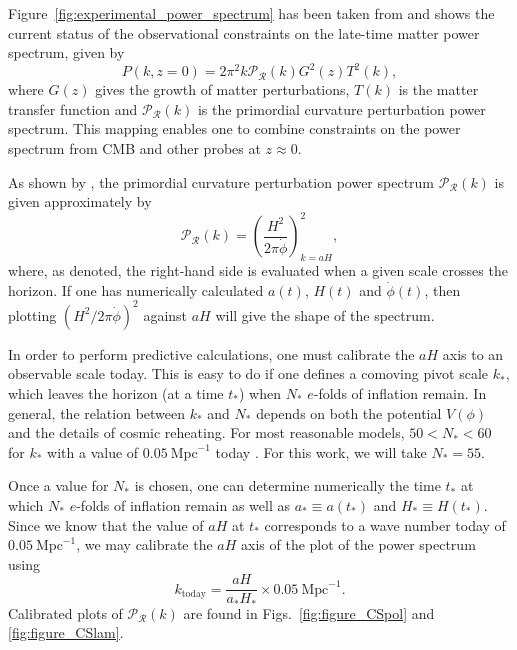 Figure~\ref{fig:experimental_power_spectrum} has been taken from \citet{hlozek_atacama_2012} and shows the current status of the observational constraints on the late-time matter power spectrum, given by
%
\begin{equation}
  P(k,z=0) = 2\pi^2 k \mathcal{P}_\mathcal{R}(k) G^2(z) T^2(k),
\end{equation}
%
where $G(z)$ gives the growth of matter perturbations, $T(k)$ is the matter transfer function and $\mathcal{P}_\mathcal{R}(k)$ is the primordial curvature perturbation power spectrum. This mapping enables one to combine constraints on the power spectrum from CMB and other probes at $z\approx 0$.




As shown by \citet{liddle_cosmological_2000}, the primordial curvature perturbation power spectrum $\mathcal{P}_{\mathcal{R}}(k)$ is given approximately by
%
\begin{equation}
  \mathcal{P}_{\mathcal{R}}(k)
  =
  \left(\frac{H^2}{2\pi\dot{\phi}}\right)^2_{k=a H},
  \label{eqn:curvature_power_spectrum}
\end{equation}
%
where, as denoted, the right-hand side is evaluated when a given scale crosses the horizon. If one has numerically calculated $a(t)$, $H(t)$ and $\dot{\phi}(t)$, then plotting $\left(H^2/ 2\pi\dot{\phi}\right)^2$ against $aH$ will give the shape of the spectrum.

In order to perform predictive calculations, one must calibrate the $aH$ axis to an observable scale today. This is easy to do if one defines a comoving pivot scale $k_*$, which leaves the horizon (at a time $t_*$) when $N_*$ $e$-folds of inflation remain. In general, the relation between $k_*$ and $N_*$ depends on both the potential $V(\phi)$ and the details of cosmic reheating. For most reasonable models, $50<N_*<60$  for $k_*$ with a value of $0.05\:\mathrm{Mpc}^{-1}$ today \citep{planck_collaboration_planck_2013-1}. For this work, we will take $N_*=55$. 

Once a value for $N_*$ is chosen, one can determine numerically the time $t_*$ at which $N_*$ $e$-folds of inflation remain as well as $a_*\equiv a(t_*)$ and $H_*\equiv H(t_*)$. Since we know that the value of $aH$ at $t_*$ corresponds to a wave number today of $0.05\:\mathrm{Mpc}^{-1}$, we may calibrate the $aH$ axis of the plot of the power spectrum using
%
\begin{equation}
  k_\mathrm{today} 
  = 
  \frac{aH}{a_*H_*}\times0.05\:\mathrm{Mpc}^{-1}.
\end{equation}
%
Calibrated plots of $\mathcal{P}_\mathcal{R}(k)$ are found in Figs.\ \nolinebreak\ref{fig:figure_CSpol} and \nolinebreak\ref{fig:figure_CSlam}. 




